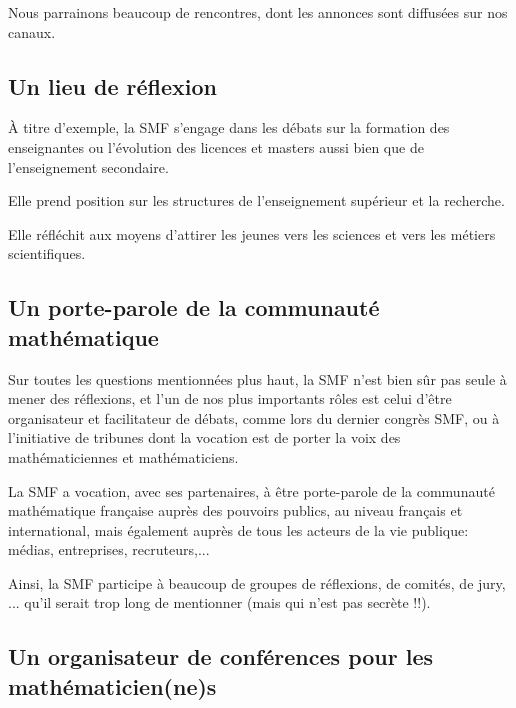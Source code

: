 Nous parrainons beaucoup de rencontres, dont les annonces sont diffus\'ees sur nos canaux.

\subsection*{Un lieu de r\'{e}flexion} 
\`{A} titre  d'exemple, la SMF s'engage dans les d\'ebats sur la formation des enseignant\mp es ou l'\'{e}volution des licences et masters aussi bien que de l'enseignement secondaire.

Elle prend position sur les structures de l'enseignement sup\'{e}rieur et la recherche.

Elle r\'{e}fl\'{e}chit aux moyens d'attirer les jeunes vers les sciences et vers les m\'{e}tiers scientifiques.  


\subsection*{Un porte-parole de la communaut\'{e} math\'{e}matique}
Sur toutes les questions mentionn\'ees plus haut, la SMF n'est bien s\^ur pas  seule \`a mener des r\'eflexions, et l'un de nos plus importants  r\^oles est celui d'\^etre organisateur  et facilitateur de d\'ebats, comme lors du dernier congr\`es SMF, ou \`a l'initiative de tribunes dont la vocation est de porter la voix des math\'ematiciennes et math\'ematiciens.

 La SMF a vocation, avec ses partenaires, \`{a} \^{e}tre porte-parole de la communaut\'{e} math\'{e}matique fran\c{c}aise aupr\`{e}s des pouvoirs publics, au niveau fran\c cais et international, mais \'egalement aupr\`es de tous les acteurs de la vie publique: m\'edias, entreprises, recruteurs,...

Ainsi, la SMF participe \`a beaucoup de groupes de r\'eflexions, de comit\'es, de jury, ... qu'il serait trop long de mentionner (mais qui n'est pas secr\`ete !!).

\subsection*{Un organisateur de   conf\'erences pour les math\'ematicien(ne)s} 

